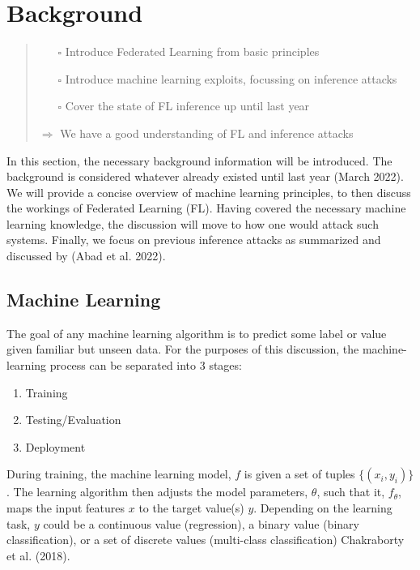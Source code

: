 \hypertarget{background}{%
\section{Background}\label{background}}

\begin{quote}
\begin{itemize}
\tightlist
\item[$\square$]
  Introduce Federated Learning from basic principles
\item[$\square$]
  Introduce machine learning exploits, focussing on inference attacks
\item[$\square$]
  Cover the state of FL inference up until last year
\end{itemize}

\(\Rightarrow\) We have a good understanding of FL and inference attacks
\end{quote}

In this section, the necessary background information will be
introduced. The background is considered whatever already existed until
last year (March 2022). We will provide a concise overview of machine
learning principles, to then discuss the workings of Federated Learning
(FL). Having covered the necessary machine learning knowledge, the
discussion will move to how one would attack such systems. Finally, we
focus on previous inference attacks as summarized and discussed by (Abad
et al. 2022).

\hypertarget{machine-learning}{%
\subsection{Machine Learning}\label{machine-learning}}

The goal of any machine learning algorithm is to predict some label or
value given familiar but unseen data. For the purposes of this
discussion, the machine-learning process can be separated into 3 stages:

\begin{enumerate}
\def\labelenumi{\arabic{enumi}.}
\tightlist
\item
  Training
\item
  Testing/Evaluation
\item
  Deployment
\end{enumerate}

During training, the machine learning model, \(f\) is given a set of
tuples \(\{(x_i, y_i)\}\). The learning algorithm then adjusts the model
parameters, \(\theta\), such that it, \(f_\theta\), maps the input
features \(x\) to the target value(s) \(y\). Depending on the learning
task, \(y\) could be a continuous value (regression), a binary value
(binary classification), or a set of discrete values (multi-class
classification) Chakraborty et al. (2018).

